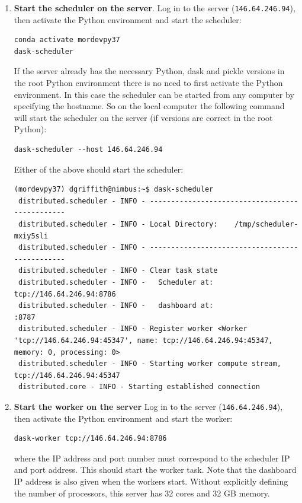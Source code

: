\begin{enumerate}
\item \textbf{Start the scheduler on the server}. Log in to the server (\lstinline{146.64.246.94}), then activate the Python environment and start the scheduler:

\begin{lstlisting}
conda activate mordevpy37
dask-scheduler
\end{lstlisting}

If the server already has the necessary Python, dask and pickle versions in the root Python environment there is no need to first activate the Python environment.  In this case the scheduler can be started from any computer by specifying the hostname. So on the local computer the following command will start the scheduler on the server (if versions are correct in the root Python):

\begin{lstlisting}
dask-scheduler --host 146.64.246.94
\end{lstlisting}

Either of the above should start the scheduler:
\begin{lstlisting}[style=tinysize]
(mordevpy37) dgriffith@nimbus:~$ dask-scheduler
 distributed.scheduler - INFO - -----------------------------------------------
 distributed.scheduler - INFO - Local Directory:    /tmp/scheduler-mxiy5sli
 distributed.scheduler - INFO - -----------------------------------------------
 distributed.scheduler - INFO - Clear task state
 distributed.scheduler - INFO -   Scheduler at:  tcp://146.64.246.94:8786
 distributed.scheduler - INFO -   dashboard at:                     :8787
 distributed.scheduler - INFO - Register worker <Worker 'tcp://146.64.246.94:45347', name: tcp://146.64.246.94:45347, memory: 0, processing: 0>
 distributed.scheduler - INFO - Starting worker compute stream, tcp://146.64.246.94:45347
 distributed.core - INFO - Starting established connection
\end{lstlisting}

\item \textbf{Start the worker on the server}  Log in to the server (\lstinline{146.64.246.94}), then activate the Python environment and start the worker:        

\begin{lstlisting}
dask-worker tcp://146.64.246.94:8786
\end{lstlisting}

where the IP address and port number must correspond to the scheduler IP and port address. This should start the worker task. Note that the dashboard IP address is also given when the workers start. Without explicitly defining the number of processors, this server has 32 cores and 32 GB memory.    


\end{enumerate}
